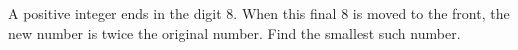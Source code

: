 A positive integer ends in the digit $8$. When this final $8$ is moved to the front, the new number is twice the original number. Find the smallest such number.
